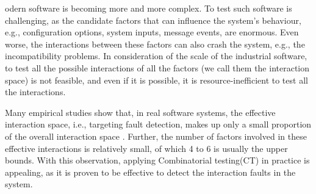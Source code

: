 \documentclass[journal,12pt,onecolumn,draftclsnofoot,]{IEEEtran}
\begin{document}
%
%
%
%
odern software is becoming more and more complex. To test such software is challenging, as the candidate factors that can influence the system's behaviour, e.g., configuration options, system inputs, message events, are enormous. Even worse, the interactions between these factors can also crash the system, e.g., the incompatibility problems. In consideration of the scale of the industrial software, to test all the possible interactions of all the factors (we call them the interaction space) is not feasible, and even if it is possible, it is resource-inefficient to test all the interactions.

Many empirical studies show that, in real software systems, the effective interaction space, i.e., targeting fault detection, makes up only a small proportion of the overall interaction space \cite{kuhn2002investigation,kuhn2004software}. Further, the number of factors involved in these effective interactions is relatively small, of which 4 to 6 is usually the upper bounds\cite{kuhn2002investigation}. With this observation, applying Combinatorial testing(CT) in practice is appealing, as it is proven to be effective to detect the interaction faults in the system.
\end{document}
